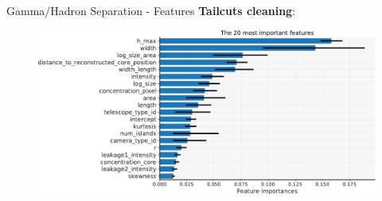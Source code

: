 

\begin{frame}{Gamma/Hadron Separation - Features}
	\textbf{Tailcuts cleaning}:
	\begin{figure}
	    \centering
	    \includegraphics[width=0.8\linewidth]{images/result_plots/tail1/sep_diff_4-crop.pdf}
	\end{figure}
\end{frame}



